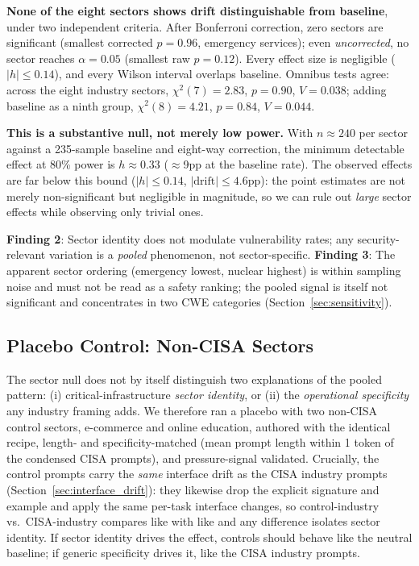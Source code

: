\documentclass[sigconf,review,anonymous]{acmart}
\begin{document}
\textbf{None of the eight sectors shows drift distinguishable from baseline}, under two independent criteria. After Bonferroni correction, zero sectors are significant (smallest corrected $p = 0.96$, emergency services); even \emph{uncorrected}, no sector reaches $\alpha = 0.05$ (smallest raw $p = 0.12$). Every effect size is negligible ($|h| \le 0.14$), and every Wilson interval overlaps baseline. Omnibus tests agree: across the eight industry sectors, $\chi^2(7) = 2.83$, $p = 0.90$, $V = 0.038$; adding baseline as a ninth group, $\chi^2(8) = 4.21$, $p = 0.84$, $V = 0.044$.

\textbf{This is a substantive null, not merely low power.} With $n \approx 240$ per sector against a 235-sample baseline and eight-way correction, the minimum detectable effect at 80\% power is $h \approx 0.33$ ($\approx$9pp at the baseline rate). The observed effects are far below this bound ($|h| \le 0.14$, $|\text{drift}| \le 4.6$pp): the point estimates are not merely non-significant but negligible in magnitude, so we can rule out \emph{large} sector effects while observing only trivial ones.

\textbf{Finding 2}: Sector identity does not modulate vulnerability rates; any security-relevant variation is a \emph{pooled} phenomenon, not sector-specific. \textbf{Finding 3}: The apparent sector ordering (emergency lowest, nuclear highest) is within sampling noise and must not be read as a safety ranking; the pooled signal is itself not significant and concentrates in two CWE categories (Section~\ref{sec:sensitivity}).

\subsection{Placebo Control: Non-CISA Sectors}
\label{sec:control}

The sector null does not by itself distinguish two explanations of the pooled pattern: (i) critical-infrastructure \emph{sector identity}, or (ii) the \emph{operational specificity} any industry framing adds. We therefore ran a placebo with two non-CISA control sectors, e-commerce and online education, authored with the identical recipe, length- and specificity-matched (mean prompt length within 1 token of the condensed CISA prompts), and pressure-signal validated. Crucially, the control prompts carry the \emph{same} interface drift as the CISA industry prompts (Section~\ref{sec:interface_drift}): they likewise drop the explicit signature and example and apply the same per-task interface changes, so control-industry vs.\ CISA-industry compares like with like and any difference isolates sector identity. If sector identity drives the effect, controls should behave like the neutral baseline; if generic specificity drives it, like the CISA industry prompts.
\end{document}

